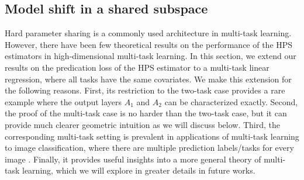 \subsection{Model shift in a shared subspace}\label{sec_same}


Hard parameter sharing is a commonly used architecture in multi-task learning. However, there have been few theoretical results on the performance of the HPS estimators in high-dimensional multi-task learning. In this section, we extend our results on the predication loss of the HPS estimator to a multi-task linear regression, where all tasks have the same covariates. We make this extension for the following reasons. First, its restriction to the two-task case provides a rare example where the output layers $A_1$ and $A_2$ can be characterized exactly. Second, the proof of the multi-task case is no harder than the two-task case, but it can provide much clearer geometric intuition  as we will discuss below. Third, the corresponding multi-task setting is prevalent in applications of multi-task learning to image classification, where there are multiple prediction labels/tasks for every image \cite{chexnet17,EA20}. Finally, it provides useful insights into a more general theory of multi-task learning, which we will explore in greater details in future works.

